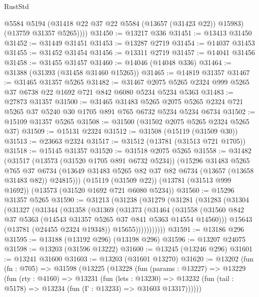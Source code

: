 \begin{lexlean}{RustStd}
\begin{coremodule}
          @5584
          @5194
          (@31418 @22 @37 @22 @5584 (@13657 (@31423 @22)) @15983)
          (@13759 @31357 @5265))))
@31450 := @13217 @336
@31451 := @13413 @31450
@31452 := @31449 @31451
@31453 := @13287 @2719
@31454 := @14037 @31453
@31455 := @31452 @31454
@31456 := @13311 @2719
@31457 := @14041 @31456
@31458 := @31455 @31457
@31460 := @14046 (@14048 @336)
@31464 := @31388 (@31393 (@31458 @31460 @15265))
@31465 := @14819 @31357
@31467 := @31465 @31357 @5265
@31482 := @31467 @2075 @5265 @2324 @999 @5265 @37 @6738 @22 @1692 @721 @842 @6080 @5234 @5234 @5363
@31483 := @27873 @31357
@31500 := @31465
    @31483
    @5265
    @2075
    @5265
    @2324
    @721
    @5265
    @37
    @5240
    @30
    @1705
    @891
    @765
    @6732
    @5234
    @5234
    @6734
@31502 := @15109 @31357 @5265
@31508 := @31500 (@31502 @2075 @5265 @2324 @5265 @37)
@31509 := @15131 @2324
@31512 := @31508 (@15119 (@31509 @30))
@31513 := @23663 @2324
@31517 := @31512 (@13781 (@31513 @721 @1705))
@31518 := @15145 @31357
@31520 := @31518 @2075 @5265
@31558 := @31482
    (@31517
      (@13573 (@31520 @1705 @891 @6732 @5234))
      (@15296
        @31483
        @5265
        @765
        @37
        @6734
        (@13649 @31483 @5265 @82 @37 @82 @6734 (@13657 (@13658 @31483 @82)) @24815)))
    (@15119 (@31509 @22))
    (@13781 (@31513 @999 @1692))
    (@13573 (@31520 @1692 @721 @6080 @5234))
@31560 := @15296 @31357 @5265
@31590 := @31213
    (@31238
      (@31279
        (@31281
          (@31283
            (@31304
              (@31327
                (@31344
                  (@31358
                    (@31369
                      (@31373
                        (@31464
                          (@31558
                            (@31560
                              @842
                              @37
                              @5363
                              (@14543 @31357 @5265 @37 @841 @5363 @14554 @14560)))
                          @15643
                          (@13781 (@24455 @2324 @19348))
                          @15655)))))))))))
@31591 := @13186 @296
@31595 := @13188 (@13192 @296) (@13198 @296)
@31596 := @13207 @24075
@31598 := @13203 (@31596 @13222)
@31600 := @13245 (@13246 @296)
@31601 := @13241 @31600
@31603 := @13203 (@31601 @13270)
@31620 := @13202
    (fun (fn : @705) =>
    @31598
      (@13225
        (@13228
          (fun (params : @13227) =>
          @13229
            (fun (rty : @4160) =>
            @13231
              (fun (lets : @13230) =>
              @13232 (fun (tail : @5178) => @13234 (fun (Γ : @13233) => @31603 @13317))))))

\end{coremodule}
\end{lexlean}
